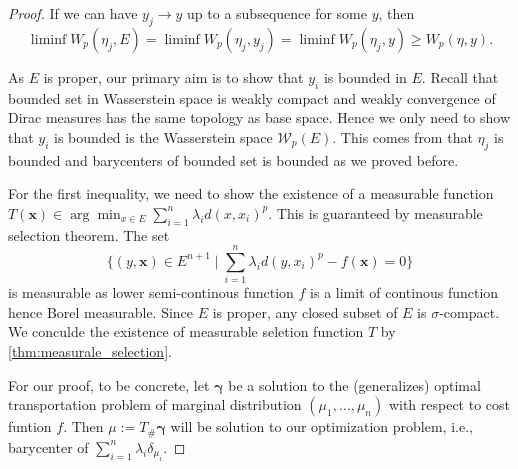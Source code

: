 \begin{proof}
		If we can have $y_j \rightarrow y$ up to a subsequence for some $y$, then 
		\[
			\liminf W_p(\eta_j, E) = \liminf W_p(\eta_j, y_j) = \liminf W_p(\eta_j, y) \geq W_p(\eta, y).
		\]

	As $E$ is proper, our primary aim is to show that $y_i$ is bounded in $E$. Recall that bounded set in Wasserstein space is weakly compact and weakly convergence of Dirac measures has the same topology as base space. Hence we only need to show that $y_i$ is bounded is the Wasserstein space $\mathcal{W}_p(E)$. This comes from that $\eta_j$ is bounded and barycenters of bounded set is bounded as we proved before.

	For the first inequality, we need to show the existence of a measurable function $T(\boldsymbol{x}) \in \arg \min_{x \in E} \sum_{i=1}^{n} \lambda_i d(x, x_i)^p$. This is guaranteed by measurable selection theorem. The set 
	\[
		\{
			(y,\boldsymbol{x}) \in E^{n+1}\mid \sum_{i=1}^{n} \lambda_i d(y,x_i)^p - f(\boldsymbol{x}) = 0
	\}
	\]
	is measurable as lower semi-continous function $f$ is a limit of continous function hence Borel measurable. Since $E$ is proper, any closed subset of $E$ is $\sigma$-compact. We conculde the existence of measurable seletion function $T$ by \cref{thm:measurale_selection}.

For our proof, to be concrete, let $\boldsymbol \gamma$ be a solution to the (generalizes) optimal transportation problem of marginal distribution $(\mu_1, \ldots, \mu_n)$ with respect to cost funtion $f$. Then $\mu:= T_{\#}\boldsymbol \gamma$ will be solution to our optimization problem, i.e., barycenter of $\sum_{i=1}^{n}\lambda_i \delta_{\mu_i}$.

\end{proof}


